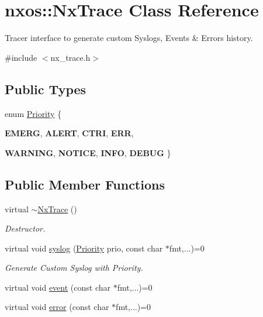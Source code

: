 \hypertarget{classnxos_1_1NxTrace}{
\section{nxos::NxTrace Class Reference}
\label{classnxos_1_1NxTrace}
}


Tracer interface to generate custom Syslogs, Events \& Errors history.  


{\ttfamily \#include $<$nx\_\-trace.h$>$}\subsection*{Public Types}
\begin{DoxyCompactItemize}
\item 
enum \hyperlink{classnxos_1_1NxTrace_a582f6e5a22e788c61807657f8bca088f}{Priority} \{ \par
{\bfseries EMERG}, 
{\bfseries ALERT}, 
{\bfseries CTRI}, 
{\bfseries ERR}, 
\par
{\bfseries WARNING}, 
{\bfseries NOTICE}, 
{\bfseries INFO}, 
{\bfseries DEBUG}
 \}
\end{DoxyCompactItemize}
\subsection*{Public Member Functions}
\begin{DoxyCompactItemize}
\item 
\hypertarget{classnxos_1_1NxTrace_a4b8ef9990a168effbca47f29d9b6ea9d}{
virtual \hyperlink{classnxos_1_1NxTrace_a4b8ef9990a168effbca47f29d9b6ea9d}{$\sim$NxTrace} ()}
\label{classnxos_1_1NxTrace_a4b8ef9990a168effbca47f29d9b6ea9d}

\begin{DoxyCompactList}\small\item\em Destructor. \item\end{DoxyCompactList}\item 
\hypertarget{classnxos_1_1NxTrace_a825db76787da234b99e81adb2def8d3d}{
virtual void \hyperlink{classnxos_1_1NxTrace_a825db76787da234b99e81adb2def8d3d}{syslog} (\hyperlink{classnxos_1_1NxTrace_a582f6e5a22e788c61807657f8bca088f}{Priority} prio, const char $\ast$fmt,...)=0}
\label{classnxos_1_1NxTrace_a825db76787da234b99e81adb2def8d3d}

\begin{DoxyCompactList}\small\item\em Generate Custom Syslog with Priority. \item\end{DoxyCompactList}\item 
virtual void \hyperlink{classnxos_1_1NxTrace_a22e5e2fff39fae68fba3051dc2720621}{event} (const char $\ast$fmt,...)=0
\item 
virtual void \hyperlink{classnxos_1_1NxTrace_afc0240b6b9a291729836ffb2fbeef8a4}{error} (const char $\ast$fmt,...)=0
\end{DoxyCompactItemize}



